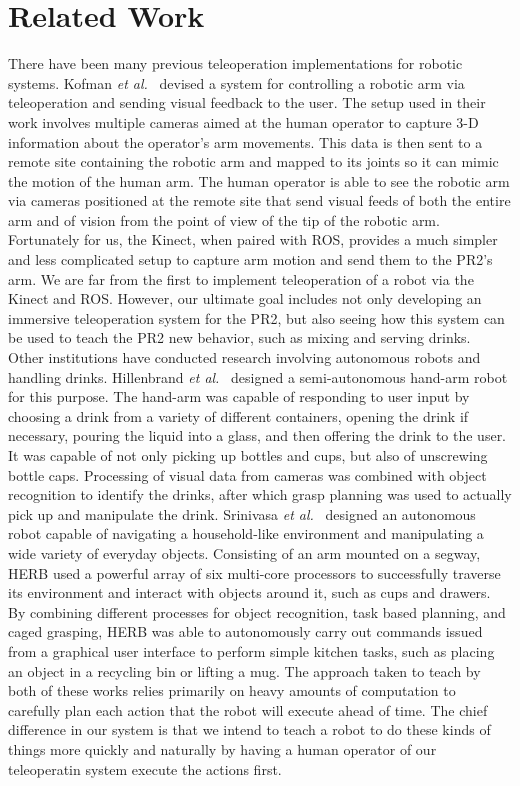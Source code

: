 \documentclass{sig-alternate}
\begin{document}
\section{Related Work}
\label{sec:related_work}
\indent There have been many previous teleoperation implementations for robotic systems. Kofman \textit{et al.}~\cite{robot_interface} devised a system for controlling a robotic arm via teleoperation and sending visual feedback to the user. The setup used in their work involves multiple cameras aimed at the human operator to capture 3-D information about the operator's arm movements. This data is then sent to a remote site containing the robotic arm and mapped to its joints so it can mimic the motion of the human arm. The human operator is able to see the robotic arm via cameras positioned at the remote site that send visual feeds of both the entire arm and of vision from the point of view of the tip of the robotic arm. Fortunately for us, the Kinect, when paired with ROS, provides a much simpler and less complicated setup to capture arm motion and send them to the PR2's arm. We are far from the first to implement teleoperation of a robot via the Kinect and ROS. However, our ultimate goal includes not only developing an immersive teleoperation system for the PR2, but also seeing how this system can be used to teach the PR2 new behavior, such as mixing and serving drinks.\\ 
\indent Other institutions have conducted research involving autonomous robots and handling drinks. Hillenbrand \textit{et al.}~\cite{pouring_arm} designed a semi-autonomous hand-arm robot for this purpose. The hand-arm was capable of responding to user input by choosing a drink from a variety of different containers, opening the drink if necessary, pouring the liquid into a glass, and then offering the drink to the user. It was capable of not only picking up bottles and cups, but also of unscrewing bottle caps. Processing of visual data from cameras was combined with object recognition to identify the drinks, after which grasp planning was used to actually pick up and manipulate the drink. Srinivasa \textit{et al.}~\cite{herb} designed an autonomous robot capable of navigating a household-like environment and manipulating a wide variety of everyday objects. Consisting of an arm mounted on a segway, HERB used a powerful array of six multi-core processors to successfully traverse its environment and interact with objects around it, such as cups and drawers. By combining different processes for object recognition, task based planning, and caged grasping, HERB was able to autonomously carry out commands issued from a graphical user interface to perform simple kitchen tasks, such as placing an object in a recycling bin or lifting a mug. The approach taken to teach by both of these works relies primarily on heavy amounts of computation to carefully plan each action that the robot will execute ahead of time.  The chief difference in our system is that we intend to teach a robot to do these kinds of things more quickly and naturally by having a human operator of our teleoperatin system execute the actions first.\\
\end{document}

